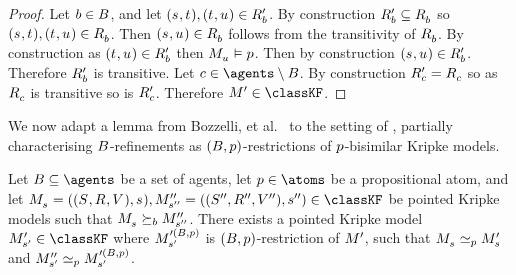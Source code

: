 \begin{proof}
Let $\agentB \in \agentsB$, and let $(\kStateS, \kStateT), (\kStateT, \kStateU) \in \kAccessibilityPB$.
By construction $\kAccessibilityPB \subseteq \kAccessibilityB$ so $(\kStateS, \kStateT), (\kStateT, \kStateU) \in \kAccessibilityB$.
Then $(\kStateS, \kStateU) \in \kAccessibilityB$ follows from the transitivity of $\kAccessibilityB$.
By construction as $(\kStateT, \kStateU) \in \kAccessibilityPB$ then $\kPModel{\kStateU} \entails \atomP$.
Then by construction $(\kStateS, \kStateU) \in \kAccessibilityPB$.
Therefore $\kAccessibilityPB$ is transitive.
Let $\agentC \in \agents \setminus \agentsB$.
By construction $\kAccessibilityPC = \kAccessibilityC$ so as $\kAccessibilityC$ is transitive so is $\kAccessibilityPC$.
Therefore $\kModelP \in \classKF$.
\end{proof}

We now adapt a lemma from Bozzelli, et al.~\cite{bozzelli:2014b} to the setting of \classKF{}, partially characterising $\agentsB$-refinements as $(\agentsB, \atomP)$-restrictions of $\atomP$-bisimilar Kripke models.

\begin{lemma}\label{rml-k4-refinement-p-bisimulation}
Let $\agentsB \subseteq \agents$ be a set of agents, let $\atomP \in \atoms$ be a propositional atom, and let $\kPModelAndTuple{\kStateS}, \kPModelAndTuplePP{\kStateSPP} \in \classKF$ be pointed Kripke models such that $\kPModel{\kStateS} \simulatesB \kPModelPP{\kStateSPP}$.
There exists a pointed Kripke model $\kPModelP{\kStateSP} \in \classKF$ where $\kPModel[\prime(\agentsB, \atomP)]{\kStateSP}$ is $(\agentsB, \atomP)$-restriction of $\kModelP$, such that $\kPModel{\kStateS} \bisimilar[\atomP] \kPModelP{\kStateS}$ and $\kPModelPP{\kStateSP} \bisimilar[\atomP] \kPModel[\prime(\agentsB, \atomP)]{\kStateSP}$.
\end{lemma}

